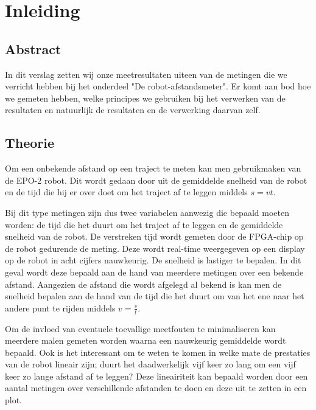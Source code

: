 \chapter{Inleiding}
\section{Abstract}
In dit verslag zetten wij onze meetresultaten uiteen van de metingen die we verricht hebben bij het onderdeel "De robot-afstandsmeter". Er komt aan bod hoe we gemeten hebben, welke principes we gebruiken bij het verwerken van de resultaten en natuurlijk de resultaten en de verwerking daarvan zelf.
\section{Theorie}
Om een onbekende afstand op een traject te meten kan men gebruikmaken van de EPO-2 robot. Dit wordt gedaan door uit de gemiddelde snelheid van de robot en de tijd die hij er over doet om het traject af te leggen middels $s = vt$.

Bij dit type metingen zijn dus twee variabelen aanwezig die bepaald moeten worden: de tijd die het duurt om het traject af te leggen en de gemiddelde snelheid van de robot. 
De verstreken tijd wordt gemeten door de FPGA-chip op de robot gedurende de meting. Deze wordt real-time weergegeven op een display op de robot in acht cijfers nauwkeurig.
De snelheid is lastiger te bepalen. In dit geval wordt deze bepaald aan de hand van meerdere metingen over een bekende afstand. Aangezien de afstand die wordt afgelegd al bekend is kan men de snelheid bepalen aan de hand van de tijd die het duurt om van het ene naar het andere punt te rijden middels $v=\frac{s}{t}$. 

Om de invloed van eventuele toevallige meetfouten te minimaliseren kan meerdere malen gemeten worden waarna een nauwkeurig gemiddelde wordt bepaald. Ook is het interessant om te weten te komen in welke mate de prestaties van de robot lineair zijn; duurt het daadwerkelijk vijf keer zo lang om een vijf keer zo lange afstand af te leggen? Deze lineairiteit kan bepaald worden door een aantal metingen over verschillende afstanden te doen en deze uit te zetten in een plot.
